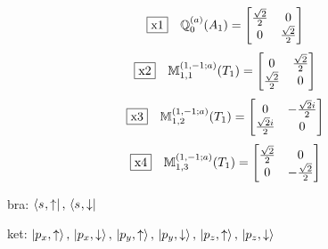 \documentclass[fleqn,10pt,landscape]{jsarticle}
\begin{document}
\begin{dmath*}
\fbox{x1}\quad \mathbb{Q}_{0}^{(a)}(A_{1})=\begin{bmatrix} \frac{\sqrt{2}}{2} & 0 \\ 0 & \frac{\sqrt{2}}{2} \end{bmatrix}
\end{dmath*}
\begin{dmath*}
\fbox{x2}\quad \mathbb{M}_{1,1}^{(1,-1;a)}(T_{1})=\begin{bmatrix} 0 & \frac{\sqrt{2}}{2} \\ \frac{\sqrt{2}}{2} & 0 \end{bmatrix}
\end{dmath*}
\begin{dmath*}
\fbox{x3}\quad \mathbb{M}_{1,2}^{(1,-1;a)}(T_{1})=\begin{bmatrix} 0 & - \frac{\sqrt{2} i}{2} \\ \frac{\sqrt{2} i}{2} & 0 \end{bmatrix}
\end{dmath*}
\begin{dmath*}
\fbox{x4}\quad \mathbb{M}_{1,3}^{(1,-1;a)}(T_{1})=\begin{bmatrix} \frac{\sqrt{2}}{2} & 0 \\ 0 & - \frac{\sqrt{2}}{2} \end{bmatrix}
\end{dmath*}
\vspace{5mm}

\noindent\textbullet\, bra: $\bra{s_{},\uparrow},\, \bra{s_{},\downarrow}$

\noindent\textbullet\, ket: $\ket{p_{x},\uparrow},\, \ket{p_{x},\downarrow},\, \ket{p_{y},\uparrow},\, \ket{p_{y},\downarrow},\, \ket{p_{z},\uparrow},\, \ket{p_{z},\downarrow}$
\end{document}
